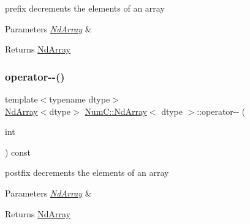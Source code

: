 prefix decrements the elements of an array


\begin{DoxyParams}{Parameters}
{\em \mbox{\hyperlink{class_num_c_1_1_nd_array}{Nd\+Array}}} & \\
\hline
\end{DoxyParams}
\begin{DoxyReturn}{Returns}
\mbox{\hyperlink{class_num_c_1_1_nd_array}{Nd\+Array}} 
\end{DoxyReturn}
\mbox{\label{class_num_c_1_1_nd_array_ae2cf6f24f8c46ac4b7409b09ecc69b0f}} 
\subsubsection{\texorpdfstring{operator-\/-\/()}{operator--()}\hspace{0.1cm}{\footnotesize\ttfamily [2/2]}}
{\footnotesize\ttfamily template$<$typename dtype$>$ \\
\mbox{\hyperlink{class_num_c_1_1_nd_array}{Nd\+Array}}$<$dtype$>$ \mbox{\hyperlink{class_num_c_1_1_nd_array}{Num\+C\+::\+Nd\+Array}}$<$ dtype $>$\+::operator-\/-\/ (\begin{DoxyParamCaption}\item[{int}]{ }\end{DoxyParamCaption}) const\hspace{0.3cm}{\ttfamily [inline]}}

postfix decrements the elements of an array


\begin{DoxyParams}{Parameters}
{\em \mbox{\hyperlink{class_num_c_1_1_nd_array}{Nd\+Array}}} & \\
\hline
\end{DoxyParams}
\begin{DoxyReturn}{Returns}
\mbox{\hyperlink{class_num_c_1_1_nd_array}{Nd\+Array}} 
\end{DoxyReturn}
\mbox{\label{class_num_c_1_1_nd_array_a2ac18779cb518cfa4dcdff53065426e7}} 
